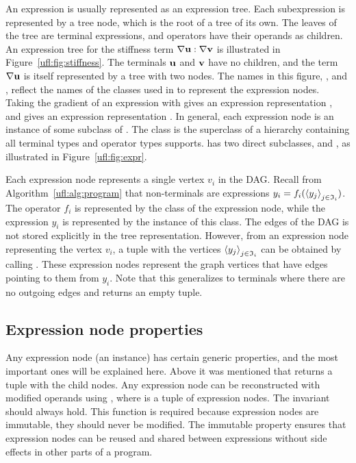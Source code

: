 An expression is usually represented as an expression tree.  Each
subexpression is represented by a tree node, which is the root of a
tree of its own.  The leaves of the tree are terminal expressions, and
operators have their operands as children.  An expression tree for the
stiffness term $\nabla\mathbf{u} :\nabla\mathbf{v}$ is illustrated in
Figure~\ref{ufl:fig:stiffness}.  The terminals $\mathbf{u}$ and $\mathbf{v}$ have no
children, and the term $\nabla\mathbf{u}$ is itself represented by a tree
with two nodes.  The names in this figure, , 
and , reflect the names of the classes used in
\ufl{} to represent the expression nodes. Taking the gradient of an
expression with  gives an expression representation
, and  gives an expression
representation .  In general, each expression node
is an instance of some subclass of .  The class
 is the superclass of a hierarchy containing all terminal
types and operator types \ufl{} supports.  has two direct
subclasses,  and , as illustrated in
Figure~\ref{ufl:fig:expr}.

Each expression node represents a single vertex $v_i$ in the DAG.
Recall from Algorithm~\ref{ufl:alg:program} that non-terminals are
expressions $y_i = f_i(\left<y_j\right>_{j\in\mathfrak{I}_i})$.  The operator
$f_i$ is represented by the class of the expression node, while the
expression $y_i$ is represented by the instance of this class.  The
edges of the DAG is not stored explicitly in the tree
representation. However, from an expression node representing the
vertex $v_i$, a tuple with the vertices $\left<y_j\right>_{j\in\mathfrak{I}_i}$
can be obtained by calling .  These expression
nodes represent the graph vertices that have edges pointing to them
from $y_i$.  Note that this generalizes to terminals where there are
no outgoing edges and  returns an empty tuple.

\subsection{Expression node properties}

Any expression node  (an  instance) has certain
generic properties, and the most important ones will be explained
here.  Above it was mentioned that  returns a
tuple with the child nodes. Any expression node can be reconstructed
with modified operands using , where
 is a tuple of expression nodes.  The invariant
 should always hold.  This
function is required because expression nodes are immutable, they
should never be modified. The immutable property ensures that
expression nodes can be reused and shared between expressions without
side effects in other parts of a program.

